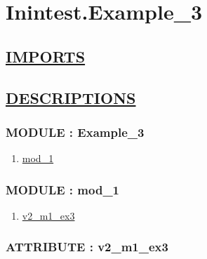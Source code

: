 \chapter*{Inintest.Example\_3}

\section*{\underline{IMPORTS}}

\section*{\underline{DESCRIPTIONS}}
\subsection*{MODULE : Example\_3}
\hypertarget{ecldoc:Inintest.Example_3_Inintest.Example_3}{}
\begin{enumerate}
\item \hyperlink{ecldoc:Inintest.Example_3_Inintest.Example_3.mod_1}{mod\_1}
\end{enumerate}
\subsection*{MODULE : mod\_1}
\hypertarget{ecldoc:Inintest.Example_3_Inintest.Example_3.mod_1}{}
\begin{enumerate}
\item \hyperlink{ecldoc:Inintest.Example_3_inintest.example_3.mod_1.v2_m1_ex3}{v2\_m1\_ex3}
\end{enumerate}
\subsection*{ATTRIBUTE : v2\_m1\_ex3}
\hypertarget{ecldoc:Inintest.Example_3_inintest.example_3.mod_1.v2_m1_ex3}{}


